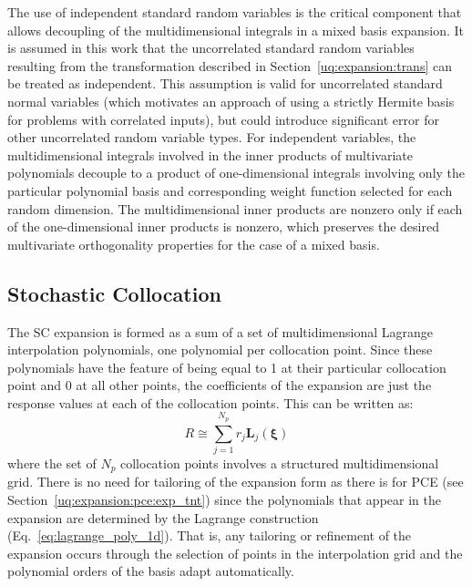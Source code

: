 The use of independent standard random variables is the critical
component that allows decoupling of the multidimensional integrals in
a mixed basis expansion.  It is assumed in this work that the
uncorrelated standard random variables resulting from the
transformation described in Section~\ref{uq:expansion:trans} can be
treated as independent.  This assumption is valid for uncorrelated
standard normal variables (which motivates an approach of using a
strictly Hermite basis for problems with correlated inputs), but could
introduce significant error for other uncorrelated random variable
types.  For independent variables, the multidimensional integrals
involved in the inner products of multivariate polynomials decouple to
a product of one-dimensional integrals involving only the particular
polynomial basis and corresponding weight function selected for each
random dimension.  The multidimensional inner products are nonzero
only if each of the one-dimensional inner products is nonzero, which
preserves the desired multivariate orthogonality properties for the
case of a mixed basis.

\subsection{Stochastic Collocation} \label{uq:expansion:sc}

The SC expansion is formed as a sum of a set of multidimensional
Lagrange interpolation polynomials, one polynomial per collocation
point.  Since these polynomials have the feature of being equal to 1
at their particular collocation point and 0 at all other points, the
coefficients of the expansion are just the response values at each of
the collocation points.  This can be written as:
\begin{equation}
R \cong \sum_{j=1}^{N_p} r_j \boldsymbol{L}_j(\boldsymbol{\xi}) 
\label{eq:sc_exp_short}
\end{equation}
where the set of $N_p$ collocation points involves a structured
multidimensional grid.  There is no need for tailoring of the
expansion form as there is for PCE (see Section~\ref{uq:expansion:pce:exp_tnt})
since the polynomials that appear in the expansion are determined by
the Lagrange construction (Eq.~\ref{eq:lagrange_poly_1d}).  That is,
any tailoring or refinement of the expansion occurs through the
selection of points in the interpolation grid and the polynomial
orders of the basis adapt automatically.

